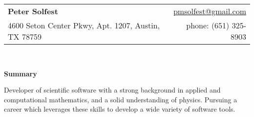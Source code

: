 \documentclass[letterpaper,11pt]{article}
\newcommand{\resheading}[1]{{\large \textbf{#1}}}
\begin{document}
\newcommand{\mywebheader}{
\begin{tabular*}{7in}{l@{\extracolsep{\fill}}r}
  \textbf{\LARGE Peter Solfest} & \href{mailto:pmsolfest@gmail.com}{pmsolfest@gmail.com}\\
	{\footnotesize 4600 Seton Center Pkwy, Apt. 1207, Austin, TX 78759} & phone: (651) 325-8903 \\
	\end{tabular*}
\\
\vspace{0.1in}}

\mywebheader

\resheading{Summary}
  
  Developer of scientific software with a strong background in applied 
  and computational mathematics, and a solid understanding of physics.
  Pursuing a career which leverages these skills to develop a wide variety 
  of software tools.

  \vspace{0.1in}
\end{document}
